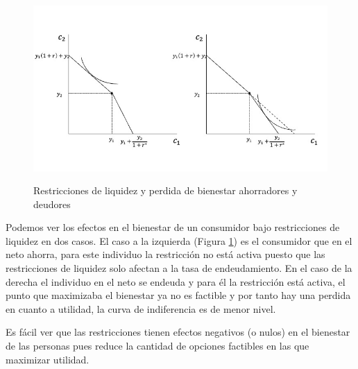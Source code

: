 \begin{figure}[t]
    \centering
    \caption{Restricciones de liquidez y perdida de bienestar ahorradores y deudores}
    \includegraphics[width=\textwidth]{Figuras/CI Restricciones de liquidez.jpeg}
    \label{fig: Restricciones liquidez bienestar}
\end{figure}

Podemos ver los efectos en el bienestar de un consumidor bajo restricciones de liquidez en dos casos. El caso a la izquierda (Figura \ref{fig: Restricciones liquidez bienestar}) es el consumidor que en el neto ahorra, para este individuo la restricción no está activa puesto que las restricciones de liquidez solo afectan a la tasa de endeudamiento. En el caso de la derecha el individuo en el neto se endeuda y para él la restricción está activa, el punto que maximizaba el bienestar ya no es factible y por tanto hay una perdida en cuanto a utilidad, la curva de indiferencia es de menor nivel. 

Es fácil ver que las restricciones tienen efectos negativos (o nulos) en el bienestar de las personas pues reduce la cantidad de opciones factibles en las que maximizar utilidad. 